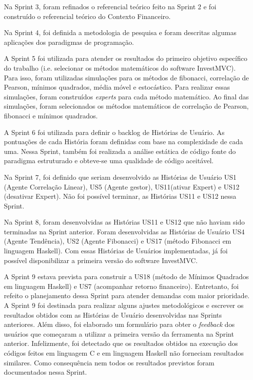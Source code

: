 Na Sprint 3, foram refinados o referencial teórico feito na Sprint 2 e foi construído o referencial teórico do Contexto Financeiro.

Na Sprint 4, foi definida a metodologia de pesquisa e foram descritas algumas aplicações dos paradigmas de programação.

A Sprint 5 foi utilizada para atender os resultados do primeiro objetivo específico do trabalho (i.e. selecionar os métodos matemáticos do software InvestMVC). Para isso, foram utilizadas simulações para os métodos de fibonacci, correlação de Pearson, mínimos quadrados, média móvel e estocástico. Para realizar essas simulações, foram construídos \textit{experts} para cada método matemático. Ao final das simulações, foram selecionados os métodos matemáticos de correlação de Pearson, fibonacci e mínimos quadrados.

A Sprint 6 foi utilizada para definir o backlog de Histórias de Usuário. As pontuações de cada História foram definidas com base na complexidade de cada uma. Nessa Sprint, também foi realizada a análise estática de código fonte do paradigma estruturado e obteve-se uma qualidade de código aceitável.

Na Sprint 7, foi definido que seriam desenvolvido as Histórias de Usuário US1 (Agente Correlação Linear), US5 (Agente gestor), US11(ativar Expert) e US12 (desativar Expert). Não foi possível terminar, as Histórias US11 e US12 nessa Sprint.

Na Sprint 8, foram desenvolvidas as Histórias US11 e US12 que não haviam sido terminadas na Sprint anterior. Foram desenvolvidas as Histórias de Usuário US4 (Agente Tendência), US2 (Agente Fibonacci) e US17 (método Fibonacci em linguagem Haskell). Com essas Histórias de Usuários implementadas, já foi possível disponibilizar a primeira versão do software InvestMVC.

A Sprint 9 estava prevista para construir a US18 (método de Mínimos Quadrados em linguagem Haskell) e US7 (acompanhar retorno financeiro). Entretanto, foi refeito o planejamento dessa Sprint para atender demandas com maior prioridade. A Sprint 9 foi destinada para realizar alguns ajustes metodológicos e escrever os resultados obtidos com as Histórias de Usuário desenvolvidas nas Sprints anteriores. Além disso, foi elaborado um formulário para obter o \textit{feedback} dos usuários que começaram a utilizar a primeira versão da ferramenta na Sprint anterior. Infelizmente, foi detectado que os resultados obtidos na execução dos códigos feitos em linguagem C e em linguagem Haskell não forneciam resultados similares. Como consequência nem todos os resultados previstos foram documentados nessa Sprint.

